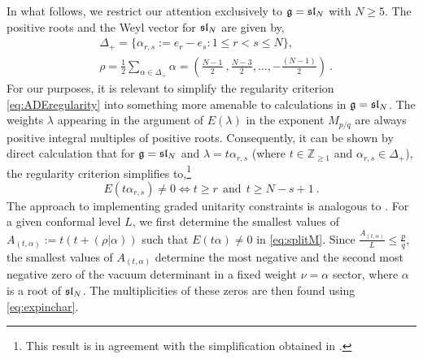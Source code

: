 In what follows, we restrict our attention exclusively to $\mathfrak{g} = \mathfrak{sl}_N$ with $N \geqslant 5$. The positive roots and the Weyl vector for $\mathfrak{sl}_N$ are given by,
\begin{equation}
\begin{split}
    &\Delta_+ = \{\alpha_{r,s} := e_r - e_s: 1 \leqslant r < s \leqslant N \}, \\
    &\rho = \frac{1}{2} \sum_{\alpha \in \Delta_+} \alpha = \left(\frac{N-1}{2}~, \frac{N-3}{2}, \ldots, -\frac{(N-1)}{2} \right)~.
\end{split}
\end{equation}
For our purposes, it is relevant to simplify the regularity criterion \eqref{eq:ADEregularity} into something more amenable to calculations in $\mathfrak{g} = \mathfrak{sl}_N$. The weights $\lambda$ appearing in the argument of $E(\lambda)$ in the exponent $M_{p/q}$ are always positive integral multiples of positive roots. Consequently, it can be shown by direct calculation that for $\mathfrak{g} = \mathfrak{sl}_N$ and $\lambda = t \alpha_{r,s}$ (where $t \in \mathbb{Z}_{\geqslant 1}$ and $\alpha_{r,s} \in \Delta_+$), the regularity criterion simplifies to,\footnote{This result is in agreement with the simplification obtained in \cite{jiang2025singular}.}
\begin{equation} \label{eq:typeAregularity}
    E(t \alpha_{r,s}) \neq 0 \Longleftrightarrow t \geqslant r \ \ \mathrm{and} \ \ t \geqslant N - s+1~.
\end{equation}
The approach to implementing graded unitarity constraints is analogous to \cite{ArabiArdehali:2025fad}. For a given conformal level $L$, we first determine the smallest values of $A_{(t,\alpha)} := t(t+(\rho|\alpha))$ such that $E(t\alpha) \neq 0$ in \eqref{eq:splitM}. Since $\frac{A_{(t,\alpha)}}{L} \leqslant \frac{p}{q}$, the smallest values of $A_{(t,\alpha)}$ determine the most negative and the second most negative zero of the vacuum determinant in a fixed weight $\nu = \alpha$ sector, where $\alpha$ is a root of $\mathfrak{sl}_N$. The multiplicities of these zeros are then found using \eqref{eq:expinchar}.

